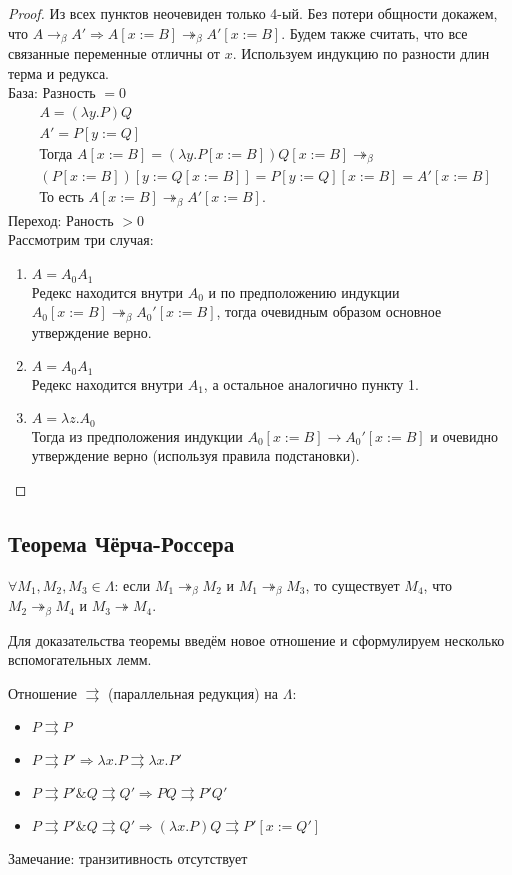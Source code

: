 \begin{proof}
Из всех пунктов неочевиден только 4-ый.
Без потери общности докажем, что $A \to_\beta A' \Rightarrow
A[x:=B] \twoheadrightarrow_\beta A'[x:=B]$.
Будем также считать, что все связанные переменные отличны от $x$.
Используем индукцию по разности длин терма и редукса. \\
База: Разность $= 0$
\begin{align}
& A = (\lambda y . P) Q \\
& A' = P[y:=Q] \\
& \text{Тогда } A[x:=B] = (\lambda y . P[x:=B]) Q[x:=B] \twoheadrightarrow_\beta \\
& (P[x:=B])[y:=Q[x:=B]] = P[y:=Q][x:=B] = A'[x:=B] \\
& \text{То есть } A[x:=B] \twoheadrightarrow_\beta A'[x:=B].
\end{align}
Переход: Раность $> 0$ \\
Рассмотрим три случая:
\begin{enumerate}
\item $A = A_0 A_1$ \\
Редекс находится внутри $A_0$ и по предположению индукции $A_0[x:=B]
\twoheadrightarrow_\beta A_0'[x:=B]$, тогда очевидным образом основное
утверждение верно.
\item $A = A_0 A_1$ \\
Редекс находится внутри $A_1$, а остальное аналогично пункту 1.
\item $A = \lambda z . A_0$ \\
Тогда из предположения индукции $A_0[x:=B] \to A_0'[x:=B]$ и
очевидно утверждение верно (используя правила подстановки).
\end{enumerate}
\end{proof}
\subsection{Теорема Чёрча-Россера}
\label{sec-2-4}
\begin{theorem}
$\forall M_1, M_2, M_3 \in \Lambda$:
если $M_1 \twoheadrightarrow_\beta M_2$ и $M_1 \twoheadrightarrow_\beta M_3$,
то существует $M_4$, что $M_2 \twoheadrightarrow_\beta M_4$ и $M_3
\twoheadrightarrow M_4$.
\end{theorem}
Для доказательства теоремы введём новое отношение и сформулируем несколько
вспомогательных лемм.
\begin{definition}
Отношение $\rightrightarrows$ (параллельная редукция) на $\Lambda$:
\begin{itemize}
\item $P \rightrightarrows P$
\item $P \rightrightarrows P' \Rightarrow \lambda x . P \rightrightarrows
\lambda x . P'$
\item $P \rightrightarrows P' \& Q \rightrightarrows Q' \Rightarrow
P Q \rightrightarrows P' Q'$
\item $P \rightrightarrows P' \& Q \rightrightarrows Q' \Rightarrow
(\lambda x . P) Q \rightrightarrows P'[x:=Q']$
\end{itemize}
Замечание: транзитивность отсутствует
\end{definition}
